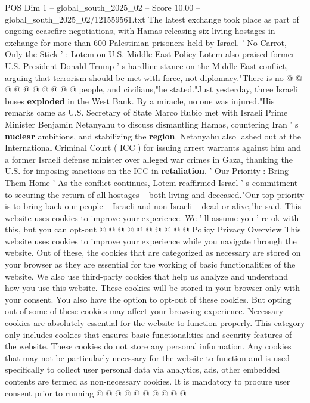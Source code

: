 \begin{textsample}{POS Dim 1 – global\_south\_2025\_02 – Score 10.00 – global\_south\_2025\_02/121559561.txt}
The latest exchange took place as part of ongoing ceasefire negotiations, with Hamas releasing six living hostages in exchange for more than 600 Palestinian prisoners held by Israel. ' No Carrot, Only the Stick ' : Lotem on U.S.
Middle East Policy Lotem also praised former U.S.
President Donald Trump ' s hardline stance on the Middle East conflict, arguing that terrorism should be met with force, not diplomacy."There is no @ @ @ @ @ @ @ @ @ @ people, and civilians,"he stated."Just yesterday, three Israeli buses \textbf{exploded} in the West Bank.
By a miracle, no one was injured."His remarks came as U.S.
Secretary of State Marco Rubio met with Israeli Prime Minister Benjamin Netanyahu to discuss dismantling Hamas, countering Iran ' s \textbf{nuclear} ambitions, and stabilizing the \textbf{region}.
Netanyahu also lashed out at the International Criminal Court ( ICC ) for issuing arrest warrants against him and a former Israeli defense minister over alleged war crimes in Gaza, thanking the U.S. for imposing sanctions on the ICC in \textbf{retaliation}. ' Our Priority : Bring Them Home ' As the conflict continues, Lotem reaffirmed Israel ' s commitment to securing the return of all hostages -- both living and deceased."Our top priority is to bring back our people -- Israeli and non-Israeli -- dead or alive,"he said.
This website uses cookies to improve your experience.
We ' ll assume you ' re ok with this, but you can opt-out @ @ @ @ @ @ @ @ @ @ Policy Privacy Overview This website uses cookies to improve your experience while you navigate through the website.
Out of these, the cookies that are categorized as necessary are stored on your browser as they are essential for the working of basic functionalities of the website.
We also use third-party cookies that help us analyze and understand how you use this website.
These cookies will be stored in your browser only with your consent.
You also have the option to opt-out of these cookies.
But opting out of some of these cookies may affect your browsing experience.
Necessary cookies are absolutely essential for the website to function properly.
This category only includes cookies that ensures basic functionalities and security features of the website.
These cookies do not store any personal information.
Any cookies that may not be particularly necessary for the website to function and is used specifically to collect user personal data via analytics, ads, other embedded contents are termed as non-necessary cookies.
It is mandatory to procure user consent prior to running @ @ @ @ @ @ @ @ @ @

\end{textsample}
